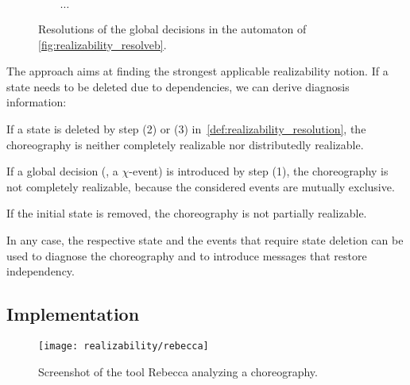 \begin{figure}
\centering
{}
$\qquad\cdots$
\caption{Resolutions of the global decisions in the automaton of \autoref{fig:realizability_resolveb}.}
\label{fig:realizability_resolve2}
\end{figure}

\medskip

The approach aims at finding the strongest applicable realizability notion. If a state needs to be deleted due to dependencies, we can derive diagnosis information:

\begin{niceitemize}
\item If a state is deleted by step (2) or (3) in~\autoref{def:realizability_resolution}, the choreography is neither completely realizable nor distributedly realizable.

\item If a global decision (\ie, a $\chi$-event) is introduced by step (1), the choreography is not completely realizable, because the considered events are mutually exclusive.

\item If the initial state is removed, the choreography is not partially realizable.
\end{niceitemize}

In any case, the respective state and the events that require state deletion can be used to diagnose the choreography and to introduce messages that restore independency.




\subsection*{Implementation}

\begin{figure}
\centering
\texttt{[image: realizability/rebecca]}
\caption{Screenshot of the tool Rebecca analyzing a choreography.}
\end{figure}



